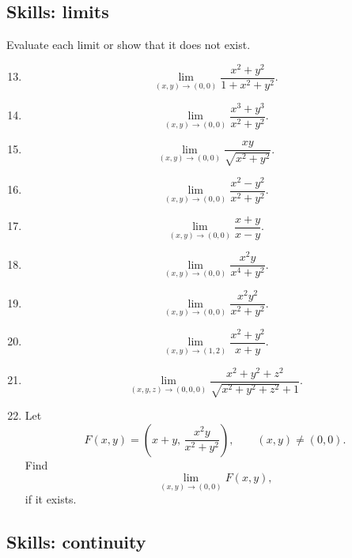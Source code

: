 \subsection*{Skills: limits}

Evaluate each limit or show that it does not exist.

\begin{enumerate}
\setcounter{enumi}{12}

\item
\[
    \lim_{(x,y)\to(0,0)}
    \frac{x^2+y^2}{1+x^2+y^2}.
\]

\item
\[
    \lim_{(x,y)\to(0,0)}
    \frac{x^3+y^3}{x^2+y^2}.
\]

\item
\[
    \lim_{(x,y)\to(0,0)}
    \frac{xy}{\sqrt{x^2+y^2}}.
\]

\item
\[
    \lim_{(x,y)\to(0,0)}
    \frac{x^2-y^2}{x^2+y^2}.
\]

\item
\[
    \lim_{(x,y)\to(0,0)}
    \frac{x+y}{x-y}.
\]

\item
\[
    \lim_{(x,y)\to(0,0)}
    \frac{x^2y}{x^4+y^2}.
\]

\item
\[
    \lim_{(x,y)\to(0,0)}
    \frac{x^2y^2}{x^2+y^2}.
\]

\item
\[
    \lim_{(x,y)\to(1,2)}
    \frac{x^2+y^2}{x+y}.
\]

\item
\[
    \lim_{(x,y,z)\to(0,0,0)}
    \frac{x^2+y^2+z^2}{\sqrt{x^2+y^2+z^2}+1}.
\]

\item Let
\[
    F(x,y)=
    \left(
        x+y,\,
        \frac{x^2y}{x^2+y^2}
    \right),
    \qquad (x,y)\ne(0,0).
\]
Find
\[
    \lim_{(x,y)\to(0,0)}F(x,y),
\]
if it exists.
\end{enumerate}

\subsection*{Skills: continuity}

